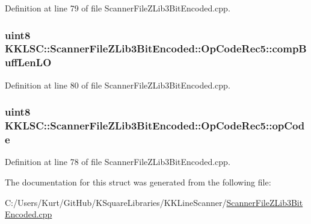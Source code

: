 Definition at line 79 of file Scanner\+File\+Z\+Lib3\+Bit\+Encoded.\+cpp.

\subsubsection[{\texorpdfstring{comp\+Buff\+Len\+LO}{compBuffLenLO}}]{\setlength{\rightskip}{0pt plus 5cm}uint8 K\+K\+L\+S\+C\+::\+Scanner\+File\+Z\+Lib3\+Bit\+Encoded\+::\+Op\+Code\+Rec5\+::comp\+Buff\+Len\+LO}\hypertarget{struct_scanner_file_z_lib3_bit_encoded_1_1_op_code_rec5_aceee0b4ce69cc47ac78e17ddcda116ec}{}\label{struct_scanner_file_z_lib3_bit_encoded_1_1_op_code_rec5_aceee0b4ce69cc47ac78e17ddcda116ec}


Definition at line 80 of file Scanner\+File\+Z\+Lib3\+Bit\+Encoded.\+cpp.

\subsubsection[{\texorpdfstring{op\+Code}{opCode}}]{\setlength{\rightskip}{0pt plus 5cm}uint8 K\+K\+L\+S\+C\+::\+Scanner\+File\+Z\+Lib3\+Bit\+Encoded\+::\+Op\+Code\+Rec5\+::op\+Code}\hypertarget{struct_scanner_file_z_lib3_bit_encoded_1_1_op_code_rec5_a587dcb7f9f189fb545a37606e206ded5}{}\label{struct_scanner_file_z_lib3_bit_encoded_1_1_op_code_rec5_a587dcb7f9f189fb545a37606e206ded5}


Definition at line 78 of file Scanner\+File\+Z\+Lib3\+Bit\+Encoded.\+cpp.



The documentation for this struct was generated from the following file\+:\begin{DoxyCompactItemize}
\item 
C\+:/\+Users/\+Kurt/\+Git\+Hub/\+K\+Square\+Libraries/\+K\+K\+Line\+Scanner/\hyperlink{_scanner_file_z_lib3_bit_encoded_8cpp}{Scanner\+File\+Z\+Lib3\+Bit\+Encoded.\+cpp}\end{DoxyCompactItemize}
